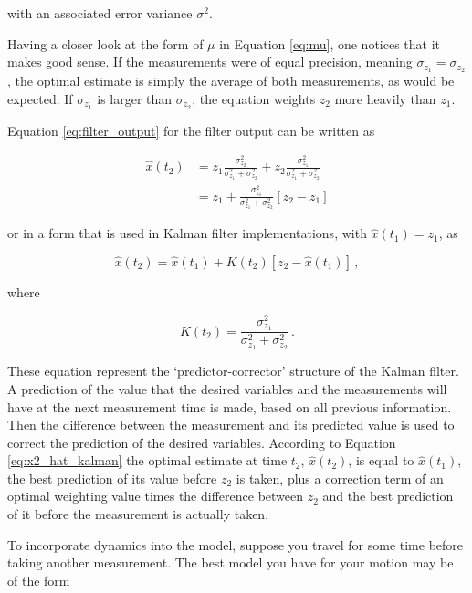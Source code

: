 \noindent
with an associated error variance $\sigma^2$.

Having a closer look at the form of $\mu$ in Equation \ref{eq:mu}, one notices that it makes good sense. If the measurements were of equal precision, meaning $\sigma_{z_1}=\sigma_{z_2}$, the optimal estimate is simply the average of both measurements, as would be expected. If $\sigma_{z_1}$ is larger than $\sigma_{z_2}$, the equation weights $z_2$ more heavily than $z_1$.

Equation \ref{eq:filter_output} for the filter output can be written as

\begin{equation}\label{eq:x2_hat}
\begin{split}
  \hat{x}(t_2) & =z_1\frac{\sigma^2_{z_2}}{\sigma^2_{z_1}+\sigma^2_{z_2}}+z_2\frac{\sigma^2_{z_1}}{\sigma^2_{z_1}+\sigma^2_{z_2}} \\
  & =z_1+\frac{\sigma^2_{z_1}}{\sigma^2_{z_1}+\sigma^2_{z_2}}[z_2-z_1]
\end{split}
\end{equation}

\noindent
or in a form that is used in Kalman filter implementations, with $\hat{x}(t_1)=z_1$, as

\begin{equation}\label{eq:x2_hat_kalman}
  \hat{x}(t_2) = \hat{x}(t_1) + K(t_2)[z_2-\hat{x}(t_1)]\,,
\end{equation}

\noindent
where

\begin{equation}\label{}
  K(t_2) = \frac{\sigma^2_{z_1}}{\sigma^2_{z_1}+\sigma^2_{z_2}}\,.
\end{equation}

\noindent
These equation represent the `predictor-corrector' structure of the Kalman filter. A prediction of the value that the desired variables and the measurements will have at the next measurement time is made, based on all previous information. Then the difference between the measurement and its predicted value is used to correct the prediction of the desired variables. According to Equation \ref{eq:x2_hat_kalman} the optimal estimate at time $t_2$, $\hat{x}(t_2)$, is equal to $\hat{x}(t_1)$, the best prediction of its value before $z_2$ is taken, plus a correction term of an optimal weighting value times the difference between $z_2$ and the best prediction of it before the measurement is actually taken.

To incorporate dynamics into the model, suppose you travel for some time before taking another measurement. The best model you have for your motion may be of the form

